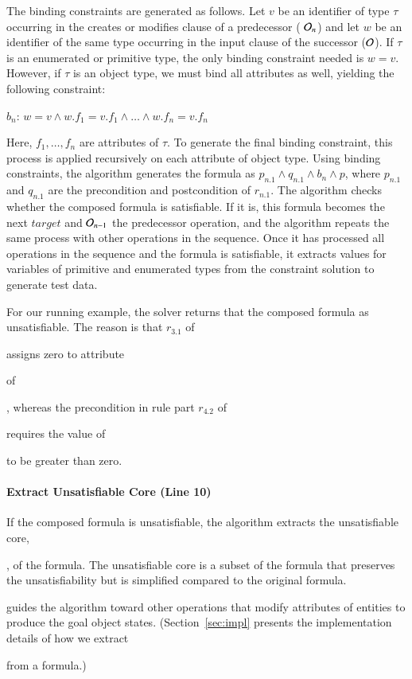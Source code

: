 The binding constraints are generated as follows. Let $v$ be an identifier of
type $\tau$ occurring in the creates or modifies clause of a predecessor (\eg
${\cal O}_n$) and let $w$ be an identifier of the same type occurring in the
input clause of the successor (\eg ${\cal O}$). If $\tau$ is an enumerated or
primitive type, the only binding constraint needed is $w = v$. However, if
$\tau$ is an object type, we must bind all attributes as well, yielding the
following constraint:

$b_n$: $w = v \wedge w.f_1 = v.f_1 \wedge \ldots \wedge w.f_n = v.f_n$ 

Here, $f_1, \ldots , f_n$ are attributes of $\tau$. To generate the final
binding constraint, this process is applied recursively on each attribute of
object type. Using binding constraints, the algorithm generates the formula as
$p_{n.1} \wedge q_{n.1} \wedge b_n \wedge p$, where $p_{n.1}$ and $q_{n.1}$ are
the precondition and postcondition of $r_{n.1}$. The algorithm checks whether
the composed formula is satisfiable.  If it is, this formula becomes the next
$target$ and ${\cal O}_{n-1}$ the predecessor operation, and the algorithm
repeats the same process with other operations in the sequence.  Once it has
processed all operations in the sequence and the formula is satisfiable, it
extracts values for variables of primitive and enumerated types from the
constraint solution to generate test data.

For our running example, the solver returns that the composed formula as
unsatisfiable. The reason is that $r_{3.1}$ of \subject{CreateOrder} assigns
zero to attribute \subject{total} of \subject{Order}, whereas the precondition
in rule part $r_{4.2}$ of \subject{GenerateInvoice} requires the value of
\subject{total} to be greater than zero.

\vskip -7pt
\paragraph*{Extract Unsatisfiable Core (Line 10)} If the composed formula is
unsatisfiable, the algorithm extracts the unsatisfiable core, \subject{ucore},
of the formula. The unsatisfiable core is a subset of the formula that preserves
the unsatisfiability but is simplified compared to the original formula.
\subject{ucore} guides the algorithm toward other operations that modify
attributes of entities to produce the goal object
states. (Section~\ref{sec:impl} presents the implementation details of how we
extract \subject{ucore} from a formula.)

